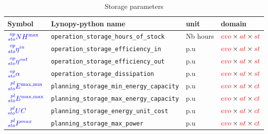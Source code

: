 \documentclass[a4paper,11pt]{article}
\begin{document}
\begin{table}[h]
\footnotesize
\centering

\caption{Storage parameters}
\begin{tabular}{llll}
\hline
    \textbf{Symbol} & \textbf{Lynopy-python name} & \textbf{unit}  & \textbf{domain} \\ \hline
    
    $\textcolor{blue}{\prescript{op}{sto}{NH^{\max}}}$&  \verb|operation_storage_hours_of_stock| & Nb hours & $\textcolor{red}{evo}  \times \textcolor{red}{at} \times \textcolor{red}{st} $ \\ 
    
    $\textcolor{blue}{\prescript{op}{sto}{\eta^{in}}}$&  \verb|operation_storage_efficiency_in| & p.u & $\textcolor{red}{evo}  \times \textcolor{red}{at} \times \textcolor{red}{st} $  \\ 
    
    $\textcolor{blue}{\prescript{op}{sto}{\eta^{out}}}$&  \verb|operation_storage_efficiency_out| & p.u & $\textcolor{red}{evo}  \times \textcolor{red}{at} \times \textcolor{red}{st} $  \\    
    
    $\textcolor{blue}{\prescript{op}{sto}{\alpha}}$&  \verb|operation_storage_dissipation| & p.u & $\textcolor{red}{evo}  \times \textcolor{red}{at} \times \textcolor{red}{st} $  \\  \hline
    
    $\textcolor{blue}{\prescript{pl}{sto}{E^{\max,\min}}}$&  \verb|planning_storage_min_energy_capacity| & p.u & $\textcolor{red}{evo}  \times \textcolor{red}{at} \times \textcolor{red}{ct} $   \\ 
    
    $\textcolor{blue}{\prescript{pl}{sto}{E^{\max,\max}}}$ & \verb|planning_storage_max_energy_capacity| & p.u & $\textcolor{red}{evo}  \times \textcolor{red}{at} \times \textcolor{red}{ct} $ \\
    
    $\textcolor{blue}{\prescript{pl}{sto}{UC}}$ & \verb|planning_storage_energy_unit_cost| & p.u & $\textcolor{red}{evo}  \times \textcolor{red}{at} \times \textcolor{red}{ct} $  \\
    
    $\textcolor{blue}{\prescript{pl}{sto}{P^{max}}}$ & \verb|planning_storage_max_power| & p.u & $\textcolor{red}{evo}  \times \textcolor{red}{at} \times \textcolor{red}{ct} $ \\ \hline
    
  \end{tabular}
\end{table}
\end{document}
